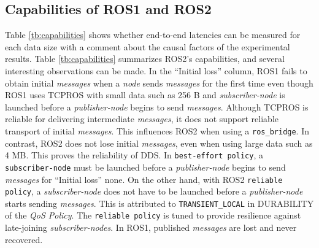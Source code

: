 \documentclass{sig-alternate-05-2015}
\begin{document}

\subsection{Capabilities of ROS1 and ROS2}
\label{sec:capacity}

Table \ref{tb:capabilities} shows whether end-to-end latencies can be measured for each data size with a comment about the causal factors of the experimental results.
Table \ref{tb:capabilities} summarizes ROS2's capabilities, and several interesting observations can be made.
In the ``Initial loss'' column, ROS1 fails to obtain initial \emph{messages} when a \emph{node} sends \emph{messages} for the first time even though ROS1 uses TCPROS with small data such as 256 B and \emph{subscriber-node} is launched before a \emph{publisher-node} begins to send \emph{messages}.
Although TCPROS is reliable for delivering intermediate \emph{messages}, it does not support reliable transport of initial \emph{messages}.
This influences ROS2 when using a \texttt{ros\_bridge}.
In contrast, ROS2 does not lose initial \emph{messages}, even when using large data such as 4 MB.
This proves the reliability of DDS.
In \texttt{best-effort policy}, a \texttt{subscriber-node} must be launched before a \emph{publisher-node} begins to send \emph{messages} for ``Initial loss'' none.
On the other hand, with ROS2 \texttt{reliable policy}, a \emph{subscriber-node} does not have to be launched before a \emph{publisher-node} starts sending \emph{messages}.
This is attributed to \texttt{TRANSIENT\_LOCAL} in DURABILITY of the \emph{QoS Policy}.
The \texttt{reliable policy} is tuned to provide resilience against late-joining \emph{subscriber-nodes}.
In ROS1, published \emph{messages} are lost and never recovered.
\end{document}
